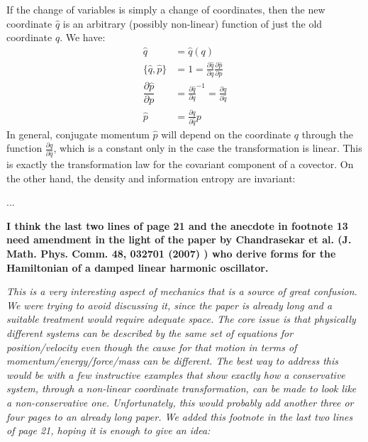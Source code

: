 \documentclass[11pt]{article}
\begin{document}
If the change of variables is simply a change of coordinates, then the new coordinate $\hat{q}$ is an arbitrary (possibly non-linear) function of just the old coordinate $q$. We have:
\begin{equation}
\label{coordinate_change}
\begin{aligned}
\hat{q} &= \hat{q}(q) \\
\{\hat{q}, \hat{p}\} &= 1 = \frac{\partial \hat{q}}{\partial q} \frac{\partial \hat{p}}{\partial p} \\
\dfrac{\partial \hat{p}}{\partial p} &= \frac{\partial \hat{q}}{\partial q} ^{-1} = \frac{\partial q}{\partial \hat{q}} \\
\hat{p} &= \frac{\partial q}{\partial \hat{q}} p
\end{aligned}
\end{equation}
In general, conjugate momentum $\hat{p}$ will depend on the coordinate $q$ through the function $\frac{\partial q}{\partial \hat{q}}$, which is a constant only in the case the transformation is linear. This is exactly the transformation law for the covariant component of a covector. On the other hand, the density and information entropy are invariant:

...

\bigskip

\textbf{I think the last two lines of page 21 and the anecdote in footnote 13 need
	amendment in the light of the paper by Chandrasekar et al. (J. Math.
	Phys. Comm. 48, 032701 (2007) ) who derive forms for the Hamiltonian
	of a damped linear harmonic oscillator.}

\emph{This is a very interesting aspect of mechanics that is a source of great confusion. We were trying to avoid discussing it, since the paper is already long and a suitable treatment would require adequate space. The core issue is that physically different systems can be described by the same set of equations for position/velocity even though the cause for that motion in terms of momentum/energy/force/mass can be different. The best way to address this would be with a few instructive examples that show exactly how a conservative system, through a non-linear coordinate transformation, can be made to look like a non-conservative one. Unfortunately, this would probably add another three or four pages to an already long paper. We added this footnote in the last two lines of page 21, hoping it is enough to give an idea:}

\bigskip
\end{document}

